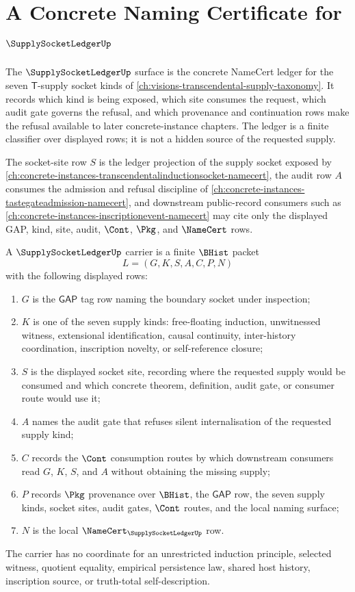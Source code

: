 \chapter{A Concrete Naming Certificate for $\SupplySocketLedgerUp$}
\label{ch:concrete-instances-supplysocketledger-namecert}

The $\SupplySocketLedgerUp$ surface is the concrete NameCert ledger for the seven $\mathsf{T}$-supply socket kinds of \autoref{ch:visions-transcendental-supply-taxonomy}. It records which kind is being exposed, which site consumes the request, which audit gate governs the refusal, and which provenance and continuation rows make the refusal available to later concrete-instance chapters. The ledger is a finite classifier over displayed rows; it is not a hidden source of the requested supply.

The socket-site row $S$ is the ledger projection of the supply socket exposed by \autoref{ch:concrete-instances-transcendentalinductionsocket-namecert}, the audit row $A$ consumes the admission and refusal discipline of \autoref{ch:concrete-instances-tastegateadmission-namecert}, and downstream public-record consumers such as \autoref{ch:concrete-instances-inscriptionevent-namecert} may cite only the displayed GAP, kind, site, audit, $\Cont$, $\Pkg$, and $\NameCert$ rows.

\begin{definition}
\label{def:supply-socket-ledger-carrier}
A $\SupplySocketLedgerUp$ carrier is a finite $\BHist$ packet
$$
L=(G,K,S,A,C,P,N)
$$
with the following displayed rows:
\begin{enumerate}
\item $G$ is the $\mathsf{GAP}$ tag row naming the boundary socket under inspection;
\item $K$ is one of the seven supply kinds: free-floating induction, unwitnessed witness, extensional identification, causal continuity, inter-history coordination, inscription novelty, or self-reference closure;
\item $S$ is the displayed socket site, recording where the requested supply would be consumed and which concrete theorem, definition, audit gate, or consumer route would use it;
\item $A$ names the audit gate that refuses silent internalisation of the requested supply kind;
\item $C$ records the $\Cont$ consumption routes by which downstream consumers read $G$, $K$, $S$, and $A$ without obtaining the missing supply;
\item $P$ records $\Pkg$ provenance over $\BHist$, the $\mathsf{GAP}$ row, the seven supply kinds, socket sites, audit gates, $\Cont$ routes, and the local naming surface;
\item $N$ is the local $\NameCert_{\SupplySocketLedgerUp}$ row.
\end{enumerate}
The carrier has no coordinate for an unrestricted induction principle, selected witness, quotient equality, empirical persistence law, shared host history, inscription source, or truth-total self-description.
\end{definition}

